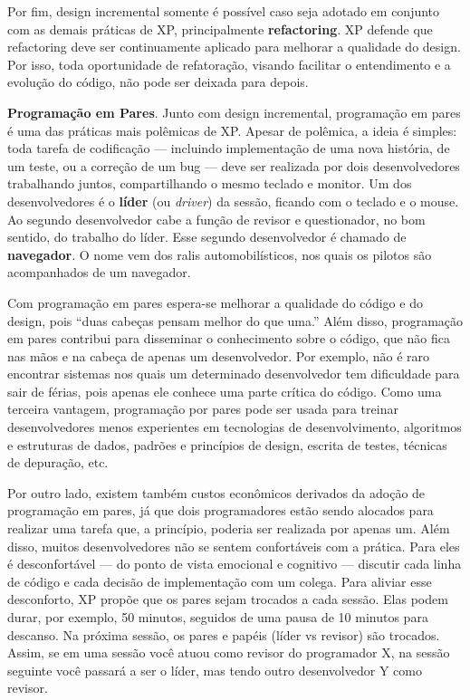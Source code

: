\documentclass[
  11pt,
  twoside]{book}
\begin{document}
Por fim, design incremental somente é possível caso seja adotado em
conjunto com as demais práticas de XP, principalmente
\textbf{refactoring}. XP defende que refactoring deve ser continuamente
aplicado para melhorar a qualidade do design. Por isso, toda
oportunidade de refatoração, visando facilitar o entendimento e a
evolução do código, não pode ser deixada para depois.

 \textbf{Programação em Pares}. Junto com
design incremental, programação em pares é uma das práticas mais
polêmicas de XP. Apesar de polêmica, a ideia é simples: toda tarefa de
codificação --- incluindo implementação de uma nova história, de um
teste, ou a correção de um bug --- deve ser realizada por dois
desenvolvedores trabalhando juntos, compartilhando o mesmo teclado e
monitor. Um dos desenvolvedores é o \textbf{líder} (ou \emph{driver}) da
sessão, ficando com o teclado e o mouse. Ao segundo desenvolvedor cabe a
função de revisor e questionador, no bom sentido, do trabalho do líder.
Esse segundo desenvolvedor é chamado de \textbf{navegador}. O nome vem
dos ralis automobilísticos, nos quais os pilotos são acompanhados de um
navegador.

Com programação em pares espera-se melhorar a qualidade do código e do
design, pois ``duas cabeças pensam melhor do que uma.'' Além disso,
programação em pares contribui para disseminar o conhecimento sobre o
código, que não fica nas mãos e na cabeça de apenas um desenvolvedor.
Por exemplo, não é raro encontrar sistemas nos quais um determinado
desenvolvedor tem dificuldade para sair de férias, pois apenas ele
conhece uma parte crítica do código. Como uma terceira vantagem,
programação por pares pode ser usada para treinar desenvolvedores menos
experientes em tecnologias de desenvolvimento, algoritmos e estruturas
de dados, padrões e princípios de design, escrita de testes, técnicas de
depuração, etc.

Por outro lado, existem também custos econômicos derivados da adoção de
programação em pares, já que dois programadores estão sendo alocados
para realizar uma tarefa que, a princípio, poderia ser realizada por
apenas um. Além disso, muitos desenvolvedores não se sentem confortáveis
com a prática. Para eles é desconfortável --- do ponto de vista
emocional e cognitivo --- discutir cada linha de código e cada decisão
de implementação com um colega. Para aliviar esse desconforto, XP propõe
que os pares sejam trocados a cada sessão. Elas podem durar, por
exemplo, 50 minutos, seguidos de uma pausa de 10 minutos para descanso.
Na próxima sessão, os pares e papéis (líder vs revisor) são trocados.
Assim, se em uma sessão você atuou como revisor do programador X, na
sessão seguinte você passará a ser o líder, mas tendo outro
desenvolvedor Y como revisor.
\end{document}
